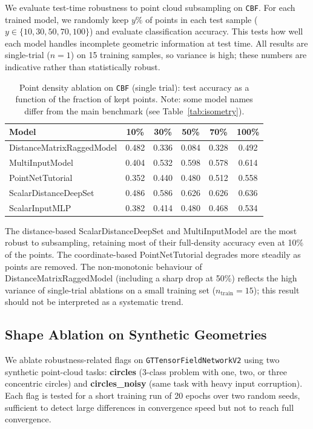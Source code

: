 \documentclass[a4paper,11pt]{article}
\begin{document}
We evaluate test-time robustness to point cloud subsampling on \texttt{CBF}.
For each trained model, we randomly keep $y\%$ of points in each test sample ($y \in \{10, 30, 50, 70, 100\}$) and evaluate classification accuracy.
This tests how well each model handles incomplete geometric information at test time.
All results are single-trial ($n\!=\!1$) on 15 training samples, so variance is high; these numbers are indicative rather than statistically robust.
\begin{table}[ht]
\centering
\caption{Point density ablation on \texttt{CBF} (single trial): test accuracy as a function of the fraction of kept points. Note: some model names differ from the main benchmark (see Table~\ref{tab:isometry}).}
\label{tab:density}
\small
\begin{tabular}{lccccc}
\toprule
Model & 10\% & 30\% & 50\% & 70\% & 100\% \\
\midrule
DistanceMatrixRaggedModel & 0.482 & 0.336 & 0.084 & 0.328 & 0.492 \\
MultiInputModel & 0.404 & 0.532 & 0.598 & 0.578 & 0.614 \\
PointNetTutorial & 0.352 & 0.440 & 0.480 & 0.512 & 0.558 \\
ScalarDistanceDeepSet & 0.486 & 0.586 & 0.626 & 0.626 & 0.636 \\
ScalarInputMLP & 0.382 & 0.414 & 0.480 & 0.468 & 0.534 \\
\bottomrule
\end{tabular}
\end{table}

The distance-based ScalarDistanceDeepSet and MultiInputModel are the most robust to subsampling, retaining most of their full-density accuracy even at 10\% of the points.
The coordinate-based PointNetTutorial degrades more steadily as points are removed.
The non-monotonic behaviour of DistanceMatrixRaggedModel (including a sharp drop at 50\%) reflects the high variance of single-trial ablations on a small training set ($n_\mathrm{train}=15$); this result should not be interpreted as a systematic trend.

\subsection{Shape Ablation on Synthetic Geometries} \label{sec:shape_ablation}

We ablate robustness-related flags on \texttt{GTTensorFieldNetworkV2} using two synthetic point-cloud tasks: \textbf{circles} (3-class problem with one, two, or three concentric circles) and \textbf{circles\_noisy} (same task with heavy input corruption).
Each flag is tested for a short training run of 20 epochs over two random seeds, sufficient to detect large differences in convergence speed but not to reach full convergence.
\end{document}
